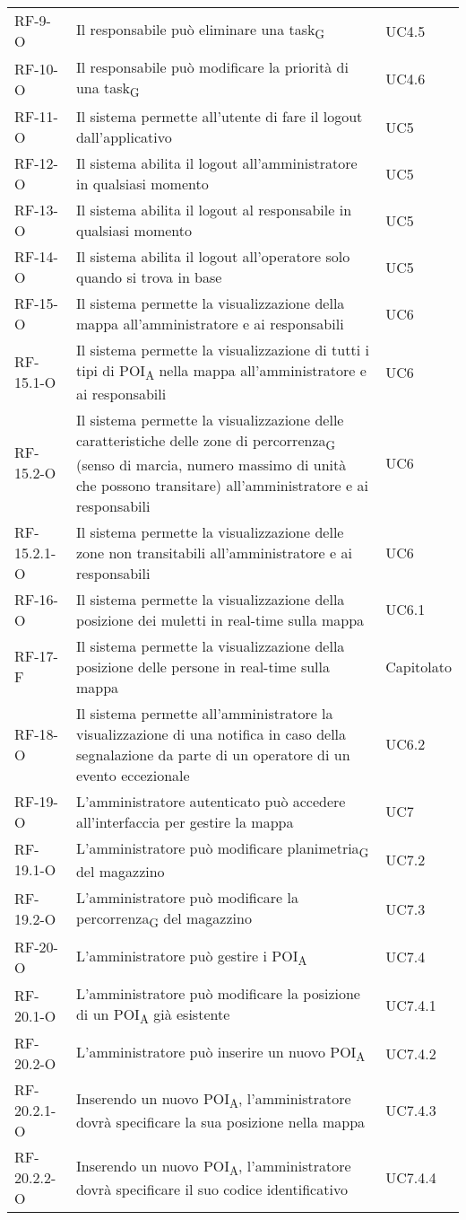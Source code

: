\begin{longtable}{ 
		>{}p{} 
		>{}p{}
		>{\centering}p{} }
RF-9-O		&	Il responsabile può eliminare una \gls{task}\textsubscript{G} 	&	UC4.5\tabularnewline
RF-10-O		&	Il responsabile può modificare la priorità di una \gls{task}\textsubscript{G} 	&	UC4.6\tabularnewline				
RF-11-O		&	Il sistema permette all'utente di fare il logout dall'applicativo	&	UC5\tabularnewline
RF-12-O		&	Il sistema abilita il logout all'amministratore in qualsiasi momento	&	UC5\tabularnewline
RF-13-O		&	Il sistema abilita il logout al responsabile in qualsiasi momento	&	UC5\tabularnewline
RF-14-O		&	Il sistema abilita il logout all'operatore solo quando si trova in base 	&	UC5\tabularnewline				
RF-15-O		&	Il sistema permette la visualizzazione della mappa all'amministratore e ai responsabili	&	UC6\tabularnewline
RF-15.1-O		&	Il sistema permette la visualizzazione di tutti i tipi di \acrshort{POI}\textsubscript{A} nella mappa all'amministratore e ai responsabili	&	UC6\tabularnewline
RF-15.2-O		&	Il sistema permette la visualizzazione delle caratteristiche delle zone di \gls{percorrenza}\textsubscript{G} (senso di marcia, numero massimo di unità che possono transitare) all'amministratore e ai responsabili	& UC6\tabularnewline
RF-15.2.1-O	&	Il sistema permette la visualizzazione delle zone non transitabili all'amministratore e ai responsabili	&	UC6 \tabularnewline
RF-16-O		&	Il sistema permette la visualizzazione della posizione dei muletti in real-time sulla mappa	&	UC6.1\tabularnewline
RF-17-F		&	Il sistema permette la visualizzazione della posizione delle persone in real-time sulla mappa	&	Capitolato\tabularnewline
RF-18-O		&	Il sistema permette all'amministratore la visualizzazione di una notifica in caso della segnalazione da parte di un operatore di un evento eccezionale	&	UC6.2\tabularnewline				
RF-19-O		&	L'amministratore autenticato può accedere all'interfaccia per gestire la mappa 	&	UC7\tabularnewline
RF-19.1-O		&	L'amministratore può modificare \gls{planimetria}\textsubscript{G} del magazzino	&	UC7.2\tabularnewline
RF-19.2-O		&	L'amministratore può modificare la \gls{percorrenza}\textsubscript{G} del magazzino	&	UC7.3\tabularnewline
RF-20-O		&	L'amministratore può gestire i \acrshort{POI}\textsubscript{A}	&	UC7.4\tabularnewline
RF-20.1-O		&	L'amministratore può modificare la posizione di un \acrshort{POI}\textsubscript{A} già esistente	&	UC7.4.1\tabularnewline
RF-20.2-O		&	L'amministratore può inserire un nuovo \acrshort{POI}\textsubscript{A}	&	UC7.4.2\tabularnewline
RF-20.2.1-O	&	Inserendo un nuovo POI\textsubscript{A}, l'amministratore dovrà specificare la sua posizione nella mappa	&	UC7.4.3\tabularnewline
RF-20.2.2-O	&	Inserendo un nuovo POI\textsubscript{A}, l'amministratore dovrà specificare il suo codice identificativo	&	UC7.4.4\tabularnewline

\end{longtable}
